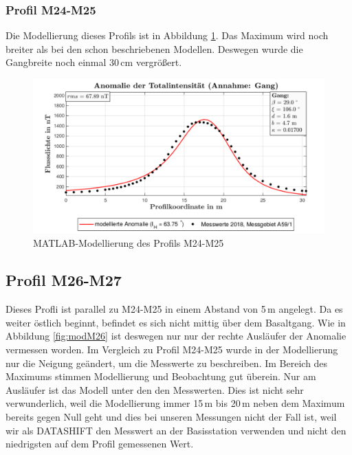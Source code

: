 \subsubsection{Profil M24-M25}

Die Modellierung dieses Profils ist in Abbildung \ref{fig:modM24}. Das Maximum wird noch breiter als bei den schon beschriebenen Modellen. Deswegen wurde die Gangbreite noch einmal 30\,cm vergrößert. 

\begin{figure}
 \centering
 \includegraphics[width=\textwidth]{fig/modM24}
 \caption{MATLAB-Modellierung des Profils M24-M25}
 \label{fig:modM24}
\end{figure}


\subsection{Profil M26-M27}

Dieses Profli ist parallel zu M24-M25 in einem Abstand von 5\,m angelegt. Da es weiter östlich beginnt, befindet es sich nicht mittig über dem Basaltgang. Wie in Abbildung \ref{fig:modM26} ist deswegen nur nur der rechte Ausläufer der Anomalie vermessen worden. Im Vergleich zu Profil M24-M25 wurde in der Modellierung nur die Neigung geändert, um die Messwerte zu beschreiben. Im Bereich des Maximums stimmen Modellierung und Beobachtung gut überein. Nur am Ausläufer ist das Modell unter den den Messwerten. Dies ist nicht sehr verwunderlich, weil die Modellierung immer 15\,m bis 20\,m neben dem Maximum bereits gegen Null geht und dies bei unseren Messungen nicht der Fall ist, weil wir als DATASHIFT den Messwert an der Basisstation verwenden und nicht den niedrigsten auf dem Profil gemessenen Wert.

